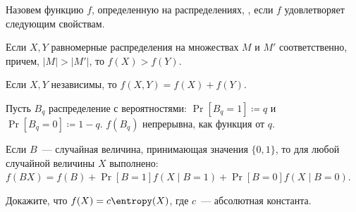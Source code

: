 Назовем функцию $f$, определенную на распределениях, , если $f$
удовлетворяет следующим свойствам.
\begin{enumtask}
    \item Если $X, Y$ равномерные распределения на множествах $M$ и $M'$ соответственно, причем, $|M| >
        |M'|$, то $f(X) > f(Y)$.
    \item Если $X, Y$ независимы, то $f(X, Y) = f(X) + f(Y)$.
    \item Пусть $B_q$ распределение с вероятностями: $\Pr[B_q = 1] \coloneqq q$ и $\Pr[B_q = 0] \coloneqq
        1 - q$. $f(B_q)$ непрерывна, как функция от $q$.
    \item Если $B$~--- случайная величина, принимающая значения $\{0, 1\}$, то для любой случайной
        величины $X$ выполнено: $f(BX) = f(B) + \Pr[B = 1] f(X \mid B = 1) + \Pr[B = 0] f(X \mid B = 0)$.
\end{enumtask}

Докажите, что $f(X) = c \entropy(X)$, где $c$~--- абсолютная константа.
